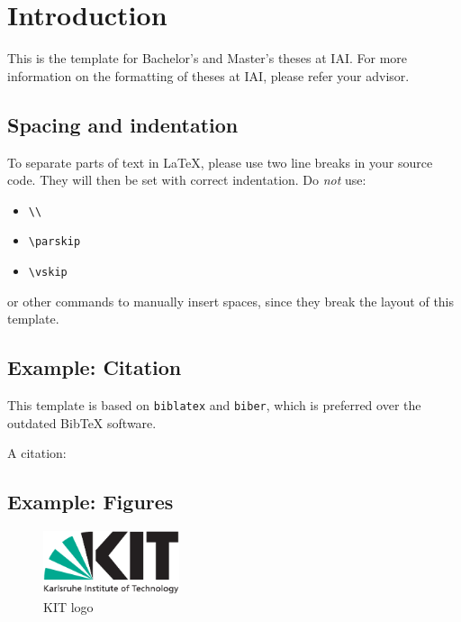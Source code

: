 
\chapter{Introduction}
\label{ch:Introduction}


This is the template for Bachelor's and Master's theses at \gls{IAI}.
For more information on the formatting of theses at \gls{IAI}, please refer your advisor.

\section{Spacing and indentation}
To separate parts of text in \LaTeX, please use two line breaks in your source code.
They will then be set with correct indentation.
Do \emph{not} use:
\begin{itemize}
  \itemsep0em
  \item \texttt{\textbackslash\textbackslash}
  \item \texttt{\textbackslash parskip}
  \item \texttt{\textbackslash vskip}
\end{itemize} 
or other commands to manually insert spaces, since they break the layout of this template.

\section{Example: Citation}
\label{sec:Introduction:Citation}
This template is based on \texttt{biblatex} and \texttt{biber}, which is preferred over the
outdated Bib\TeX{} software.

A citation: \cite{becker2008a} 
\section{Example: Figures}
\label{sec:Introduction:Figures}
\begin{figure}
\centering
\includegraphics[width=4cm]{logos/kitlogo_en_cmyk.pdf}
\caption{KIT logo}
\label{fig:kit1logo}
\end{figure}

